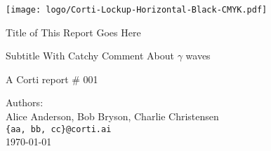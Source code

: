 \begin{titlepage}
\begin{center}

    \texttt{[image: logo/Corti-Lockup-Horizontal-Black-CMYK.pdf]}
    \vspace{1in}

    \rmfamily
    \huge
    Title of This Report Goes Here \\
    \vspace{1cm}
 

    \Large
    Subtitle With Catchy Comment About $\gamma$ waves
    
    \sffamily

    \vfill

    \large
    A Corti report \# 001 \\


    \vspace{0.8cm}

    Authors:  \\
    Alice Anderson,
    Bob Bryson, 
    Charlie Christensen \\
    
    \texttt{\{aa, bb, cc\}@corti.ai} \\


    \today \\
    
    \vspace{2cm}


\end{center}
\end{titlepage}
